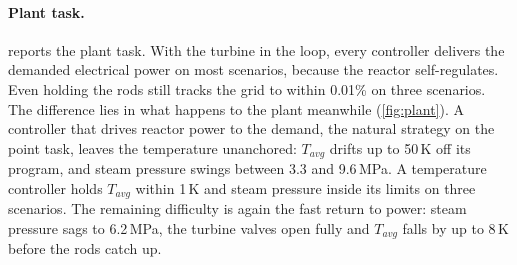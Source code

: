 \documentclass[11pt,a4paper]{article}
\begin{document}
\paragraph{Plant task.}  reports the plant task. With the
turbine in the loop, every controller delivers the demanded electrical power on most
scenarios, because the reactor self-regulates. Even holding the rods still tracks the
grid to within 0.01\% on three scenarios. The difference lies in what happens to the
plant meanwhile (\cref{fig:plant}). A controller that drives reactor power to the
demand, the natural strategy on the point task, leaves the temperature unanchored:
$T_{avg}$ drifts up to 50\,K off its program, and steam pressure swings between 3.3 and
9.6\,MPa. A temperature controller holds $T_{avg}$ within 1\,K and steam pressure inside
its limits on three scenarios. The remaining difficulty is again the fast return to
power: steam pressure sags to 6.2\,MPa, the turbine valves open fully and $T_{avg}$
falls by up to 8\,K before the rods catch up.
\end{document}
